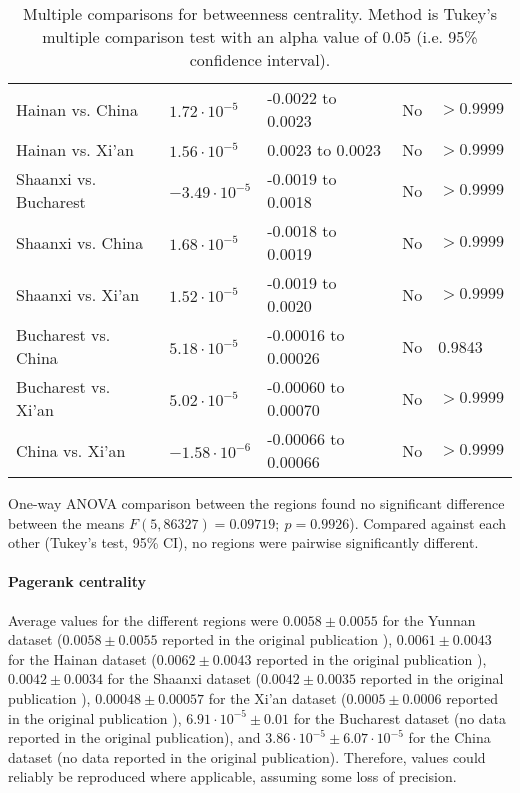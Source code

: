 \begin{table}[h]
\begin{mdframed}
\begin{tabular*}{\linewidth}{l|llll}
			Hainan vs. China & $1.72\cdot 10^{-5}$ & -0.0022 to 0.0023 & No & $>0.9999$\\
			Hainan vs. Xi'an & $1.56\cdot 10^{-5}$ & 0.0023 to 0.0023 & No & $>0.9999$\\
			Shaanxi vs. Bucharest & $-3.49\cdot 10^{-5}$ & -0.0019 to 0.0018 & No & $>0.9999$\\
			Shaanxi vs. China & $1.68\cdot 10^{-5}$ & -0.0018 to 0.0019 & No & $>0.9999$\\
			Shaanxi vs. Xi'an & $1.52\cdot 10^{-5}$ & -0.0019 to 0.0020 & No & $>0.9999$\\
			Bucharest vs. China & $5.18\cdot 10^{-5}$ & -0.00016 to 0.00026 & No & 0.9843\\
			Bucharest vs. Xi'an & $5.02\cdot 10^{-5}$ & -0.00060 to 0.00070 & No & $>0.9999$\\
			China vs. Xi'an & $-1.58\cdot 10^{-6}$ & -0.00066 to 0.00066 & No & $>0.9999$\\
			\hline
		\end{tabular*}
		\caption{Multiple comparisons for betweenness centrality. Method is Tukey's multiple comparison test with an alpha value of 0.05 (i.e. 95\% confidence interval).}
		\label{tab:betweenness_centrality_tukey}
	\end{mdframed}
\end{table}

One-way ANOVA comparison between the regions found no significant difference between the means $F(5,86327) = 0.09719; \: p=0.9926$). Compared against each other (Tukey's test, 95\% CI), no regions were pairwise significantly different.

\paragraph{Pagerank centrality} Average values for the different regions were $0.0058\pm0.0055$ for the Yunnan dataset ($0.0058\pm0.0055$ reported in the original publication \cite{hainan_publication}), $0.0061\pm0.0043$ for the Hainan dataset ($0.0062\pm0.0043$ reported in the original publication \cite{hainan_publication}), $0.0042\pm0.0034$ for the Shaanxi dataset ($0.0042\pm0.0035$ reported in the original publication \cite{shaanxi_publication}), $0.00048\pm0.00057$ for the Xi'an dataset ($0.0005\pm0.0006$ reported in the original publication \cite{xian_publication}), $6.91\cdot 10^{-5}\pm0.01$ for the Bucharest dataset (no data reported in the original publication), and $3.86\cdot 10^{-5}\pm6.07\cdot 10^{-5}$ for the China dataset (no data reported in the original publication). Therefore, values could reliably be reproduced where applicable, assuming some loss of precision.

